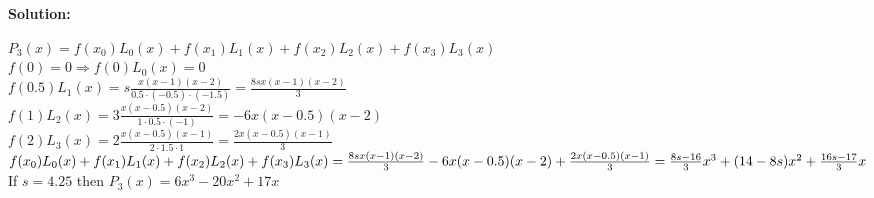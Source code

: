 \documentclass[12pt]{article}
\begin{document}
\begin{enumerate}[label=\bfseries Problem \arabic*:]
\vspace{1em}
\textbf{Solution:}\par 
$P_3(x)=f(x_0)L_0(x)+f(x_1)L_1(x)+f(x_2)L_2(x)+f(x_3)L_3(x)$\\
$f(0)=0\Rightarrow f(0)L_0(x)=0$\\
$f(0.5)L_1(x)=s\frac{x(x-1)(x-2)}{0.5\cdot(-0.5)\cdot(-1.5)}=\frac{8sx(x-1)(x-2)}{3}$\\
$f(1)L_2(x)=3\frac{x(x-0.5)(x-2)}{1\cdot0.5\cdot(-1)}=-6x(x-0.5)(x-2)$\\
$f(2)L_3(x)=2\frac{x(x-0.5)(x-1)}{2\cdot1.5\cdot1}=\frac{2x(x-0.5)(x-1)}{3}$\\
$f(x_0)L_0(x)+f(x_1)L_1(x)+f(x_2)L_2(x)+f(x_3)L_3(x)\\
=\frac{8sx(x-1)(x-2)}{3}-6x(x-0.5)(x-2)+\frac{2x(x-0.5)(x-1)}{3}\\
=\frac{8s-16}{3}x^3+(14-8s)x^2+\frac{16s-17}{3}x$\\
If $s=4.25$ then $P_3(x)=6x^3-20x^2+17x$



\end{enumerate}
\end{document}
